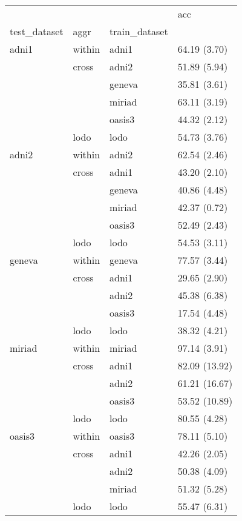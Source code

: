 \begin{table}
\centering
\begin{tabular}{llll}
\toprule
       &      &      &            acc \\
test\_dataset & aggr & train\_dataset &                \\
\midrule
adni1 & within & adni1 &   64.19 (3.70) \\
       & cross & adni2 &   51.89 (5.94) \\
       &      & geneva &   35.81 (3.61) \\
       &      & miriad &   63.11 (3.19) \\
       &      & oasis3 &   44.32 (2.12) \\
       & lodo & lodo &   54.73 (3.76) \\
\midrule
adni2 & within & adni2 &   62.54 (2.46) \\
       & cross & adni1 &   43.20 (2.10) \\
       &      & geneva &   40.86 (4.48) \\
       &      & miriad &   42.37 (0.72) \\
       &      & oasis3 &   52.49 (2.43) \\
       & lodo & lodo &   54.53 (3.11) \\
\midrule
geneva & within & geneva &   77.57 (3.44) \\
       & cross & adni1 &   29.65 (2.90) \\
       &      & adni2 &   45.38 (6.38) \\
       &      & oasis3 &   17.54 (4.48) \\
       & lodo & lodo &   38.32 (4.21) \\
\midrule
miriad & within & miriad &   97.14 (3.91) \\
       & cross & adni1 &  82.09 (13.92) \\
       &      & adni2 &  61.21 (16.67) \\
       &      & oasis3 &  53.52 (10.89) \\
       & lodo & lodo &   80.55 (4.28) \\
\midrule
oasis3 & within & oasis3 &   78.11 (5.10) \\
       & cross & adni1 &   42.26 (2.05) \\
       &      & adni2 &   50.38 (4.09) \\
       &      & miriad &   51.32 (5.28) \\
       & lodo & lodo &   55.47 (6.31) \\
\bottomrule
\end{tabular}
\end{table}
